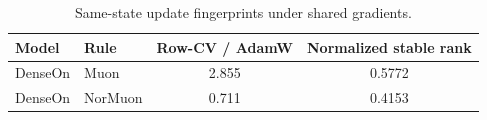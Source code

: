 \begin{table}[t]
\centering
\small
\begin{tabular}{llcc}
\toprule
Model & Rule & Row-CV / AdamW & Normalized stable rank \\
\midrule
DenseOn & Muon & 2.855 & 0.5772 \\
DenseOn & NorMuon & 0.711 & 0.4153 \\
\bottomrule
\end{tabular}
\caption{Same-state update fingerprints under shared gradients.}
\label{tab:common-state-results}
\end{table}
